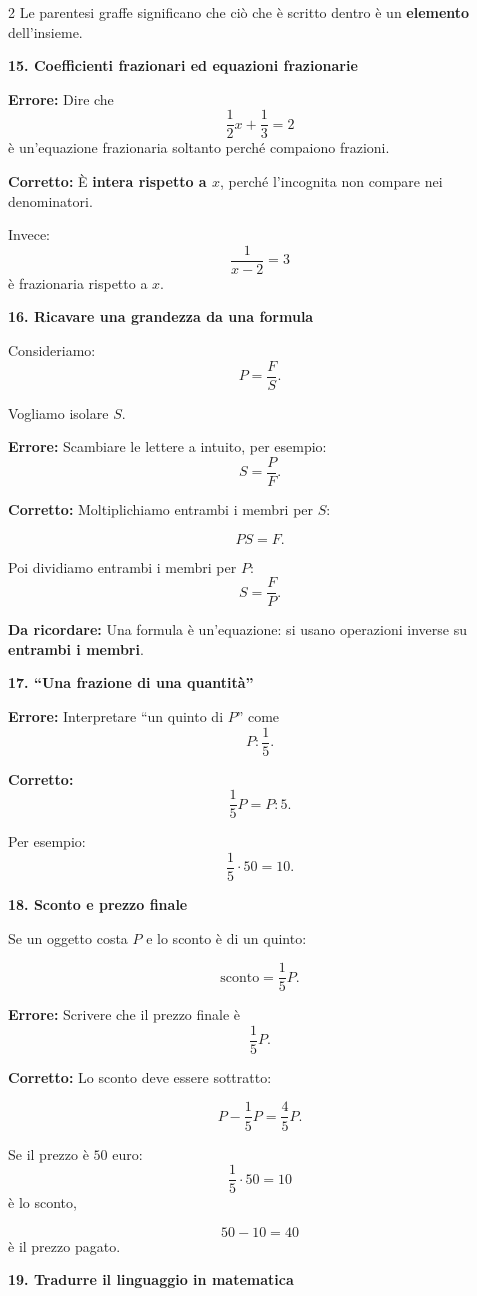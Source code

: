 \documentclass[9pt,a4paper]{extarticle}
\newcommand{\err}[1]{%
	{\color{errore}\textbf{Errore:}} #1
}
\newcommand{\corr}[1]{%
	{\color{corretto}\textbf{Corretto:}} #1
}
\newcommand{\regola}[1]{%
	{\color{titolo}\textbf{Da ricordare:}} #1
}
\newcommand{\voce}[1]{%
	\vspace{3pt}
	{\color{titolo}\textbf{#1}}\par
	\vspace{1pt}
}
\begin{document}
\begin{multicols}{2}
Le parentesi graffe significano che ciò che è scritto dentro
è un \textbf{elemento} dell'insieme.

\voce{15. Coefficienti frazionari ed equazioni frazionarie}

\err{Dire che
\[
\frac12x+\frac13=2
\]
è un'equazione frazionaria soltanto perché compaiono frazioni.}

\corr{È \textbf{intera rispetto a $x$}, perché l'incognita
non compare nei denominatori.}

Invece:
\[
\frac1{x-2}=3
\]
è frazionaria rispetto a $x$.

\voce{16. Ricavare una grandezza da una formula}

Consideriamo:
\[
P=\frac{F}{S}.
\]

Vogliamo isolare $S$.

\err{Scambiare le lettere a intuito, per esempio:
\[
S=\frac{P}{F}.
\]
}

\corr{Moltiplichiamo entrambi i membri per $S$:}
\[
PS=F.
\]

Poi dividiamo entrambi i membri per $P$:
\[
S=\frac{F}{P}.
\]

\regola{Una formula è un'equazione:
si usano operazioni inverse su \textbf{entrambi i membri}.}

\voce{17. ``Una frazione di una quantità''}

\err{Interpretare ``un quinto di $P$'' come
\[
P:\frac15.
\]
}

\corr{
\[
\frac15P=P:5.
\]
}

Per esempio:
\[
\frac15\cdot50=10.
\]

\voce{18. Sconto e prezzo finale}

Se un oggetto costa $P$ e lo sconto è di un quinto:

\[
\text{sconto}=\frac15P.
\]

\err{Scrivere che il prezzo finale è
\[
\frac15P.
\]
}

\corr{Lo sconto deve essere sottratto:}
\[
P-\frac15P
=
\frac45P.
\]

Se il prezzo è $50$ euro:
\[
\frac15\cdot50=10
\]
è lo sconto,

\[
50-10=40
\]
è il prezzo pagato.

\voce{19. Tradurre il linguaggio in matematica}


\end{multicols}
\end{document}
